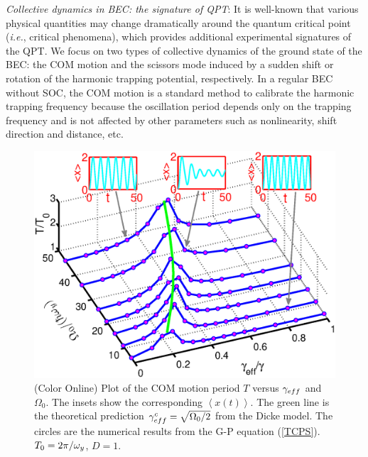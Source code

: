 \documentclass[prl,twocolumn,superscriptaddress,showpacs,floatfix]{revtex4}
\begin{document}
\emph{Collective dynamics in BEC: the signature of QPT}: It is well-known
that various physical quantities may change dramatically around the quantum
critical point (\textit{i.e.}, critical phenomena), which provides
additional experimental signatures of the QPT. We focus on two types of
collective dynamics of the ground state of the BEC: the COM motion and the
scissors mode induced by a sudden shift or rotation of the harmonic trapping
potential, respectively. In a regular BEC without SOC, the COM motion is a
standard method to calibrate the harmonic trapping frequency because the
oscillation period depends only on the trapping frequency \cite{Stringari}
and is not affected by other parameters such as nonlinearity, shift
direction and distance, etc.

\begin{figure}[tbp]
\includegraphics[width=1\linewidth]{Fig3.eps}
\caption{(Color Online) Plot of the COM motion period $T$ versus $\protect%
\gamma _{eff}$ and $\Omega _{0}$. The insets show the corresponding $%
\left\langle x\left( t\right) \right\rangle $. The green line is the
theoretical prediction $\protect\gamma _{eff}^{c}=\protect\sqrt{\Omega _{0}/2%
}$ from the Dicke model. The circles are the numerical results from the G-P
equation (\protect\ref{TCPS}). $T_{0}=2\protect\pi /\protect\omega _{y}$, $%
D=1$. }
\label{COMT}
\end{figure}
\end{document}
